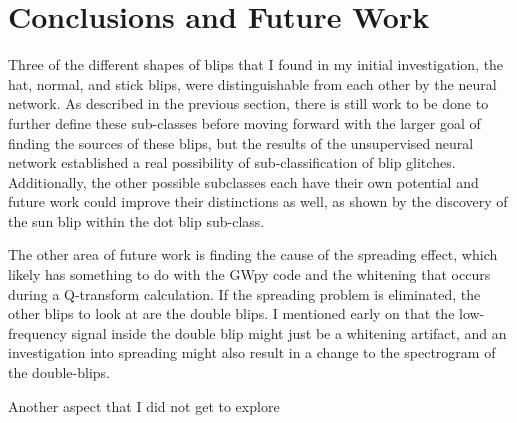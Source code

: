 \documentclass[a4paper]{article}
\begin{document}
\section{Conclusions and Future Work}

Three of the different shapes of blips that I found in my initial investigation, the hat, normal, and stick blips, were distinguishable from each other by the neural network. As described in the previous section, there is still work to be done to further define these sub-classes before moving forward with the larger goal of finding the sources of these blips, but the results of the unsupervised neural network established a real possibility of sub-classification of blip glitches. Additionally, the other possible subclasses each have their own potential and future work could improve their distinctions as well, as shown by the discovery of the sun blip within the dot blip sub-class. 

The other area of future work is finding the cause of the spreading effect, which likely has something to do with the GWpy code and the whitening that occurs during a Q-transform calculation. If the spreading problem is eliminated, the other blips to look at are the double blips. I mentioned early on that the low-frequency signal inside the double blip might just be a whitening artifact, and an investigation into spreading might also result in a change to the spectrogram of the double-blips.

Another aspect that I did not get to explore 



\end{document}
